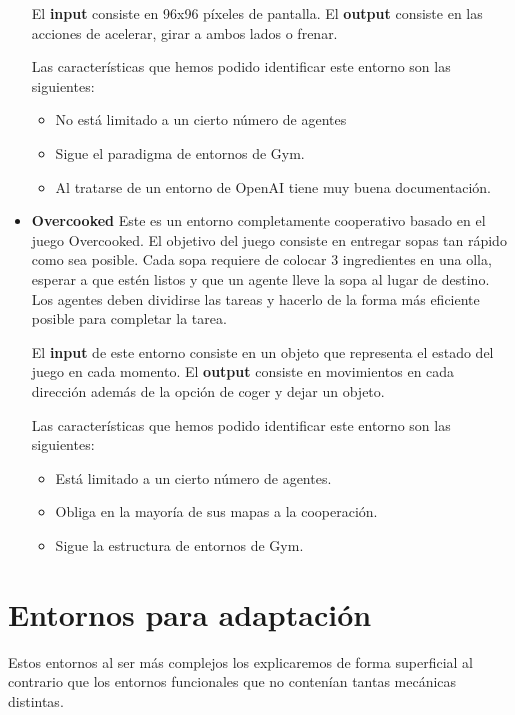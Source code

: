 \begin{itemize}
	      El \textbf{input} consiste en 96x96 píxeles de pantalla. El \textbf{output} consiste en las acciones de acelerar, girar a ambos lados o frenar.

	      Las características que hemos podido identificar este entorno son las siguientes:
	      \begin{itemize}
		      \item No está limitado a un cierto número de agentes
		      \item Sigue el paradigma de entornos de Gym.
		      \item Al tratarse de un entorno de OpenAI tiene muy buena documentación.
	      \end{itemize}
            
    \item \textbf{Overcooked} \cite {overcooked} Este es un entorno completamente cooperativo basado en el juego Overcooked. El objetivo del juego consiste en entregar sopas tan rápido como sea posible. Cada sopa requiere de colocar 3 ingredientes en una olla, esperar a que estén listos y que un agente lleve la sopa al lugar de destino. Los agentes deben dividirse las tareas y hacerlo de la forma más eficiente posible para completar la tarea.
    
    El \textbf{input} de este entorno consiste en un objeto que representa el estado del juego en cada momento. El \textbf{output} consiste en movimientos en cada dirección además de la opción de coger y dejar un objeto.

    Las características que hemos podido identificar este entorno son las siguientes:
	      \begin{itemize}
		      \item Está limitado a un cierto número de agentes.
		      \item Obliga en la mayoría de sus mapas a la cooperación.
		      \item Sigue la estructura de entornos de Gym.
	      \end{itemize}

\end{itemize}

\section{Entornos para adaptación}

Estos entornos al ser más complejos los explicaremos de forma superficial al contrario que los entornos funcionales que no contenían tantas mecánicas distintas.

